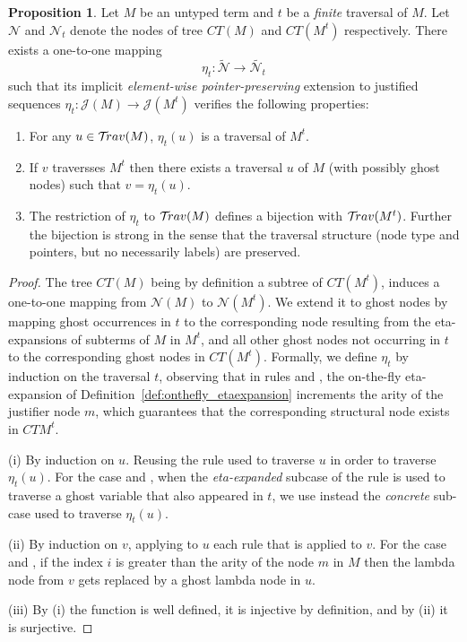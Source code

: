 \documentclass{article}
\theoremstyle{definition}
\newtheorem{proposition}{Proposition}[section]
\newcommand\Nodes{\mathcal{N}}%
\newcommand{\travulc}{\travset}
\newcommand{\ctree}{CT} %
\begin{document}
\begin{proposition}
\label{prop:eta_expanded_trav}
Let $M$ be an untyped term and $t$ be a \emph{finite} traversal of $M$.
Let $\Nodes$ and $\Nodes_t$ denote the nodes of tree $\ctree(M)$ and $\ctree(M^t)$ respectively. There exists a one-to-one mapping
$$
\eta_t : \tilde{\Nodes} \longrightarrow \tilde{\Nodes_t}
$$
such that its implicit \emph{element-wise pointer-preserving} extension to justified sequences $\eta_t : \mathcal{J}(M) \longrightarrow \mathcal{J}(M^t)$ verifies the following properties:
\begin{enumerate}[label=(\roman*)]
    \item For any $u \in \travulc(M)$, $\eta_t(u)$ is a traversal of $M^t$.

    \item If $v$ traversses
    $M^t$
    then there exists a traversal $u$ of $M$ (with possibly ghost nodes) such that $v = \eta_t(u)$.

    \item The restriction of $\eta_t$ to $\mathcal{T}\!rav(M)$ defines a bijection with $\mathcal{T}\!rav(M^t)$. Further the bijection is strong in the sense that the traversal structure (node type and pointers, but no necessarily labels) are preserved.
\end{enumerate}
\end{proposition}
\begin{proof}
The tree $\ctree(M)$ being by definition a subtree of $\ctree(M^t)$, induces a one-to-one mapping from $\Nodes(M)$ to $\Nodes(M^t)$.
We extend it to ghost nodes by mapping ghost occurrences in $t$ to the corresponding node resulting from the eta-expansions of subterms of $M$ in $M^t$, and all other ghost nodes not occurring in $t$ to the corresponding ghost nodes in $\ctree(M^t)$. Formally, we define $\eta_t$ by induction on the traversal $t$, observing that in rules  and , the on-the-fly eta-expansion of Definition~\ref{def:onthefly_etaexpansion} increments the arity of the justifier node $m$, which guarantees that the corresponding structural node exists in $\ctree{M^t}$.

(i) By induction on $u$. Reusing the rule used to traverse $u$ in order to traverse $\eta_t(u)$. For the case  and , when the \emph{eta-expanded} subcase of the rule is used to traverse a ghost variable that also appeared in $t$, we use instead the \emph{concrete} sub-case used to traverse $\eta_t(u)$.

(ii) By induction on $v$, applying to $u$ each rule that is applied to $v$. For the case  and , if the index $i$ is greater than the arity of the node $m$ in $M$ then the lambda node from $v$ gets replaced by a ghost lambda node in $u$.

(iii) By (i) the function is well defined, it is injective by definition, and by (ii) it is surjective.
\end{proof}
\end{document}
